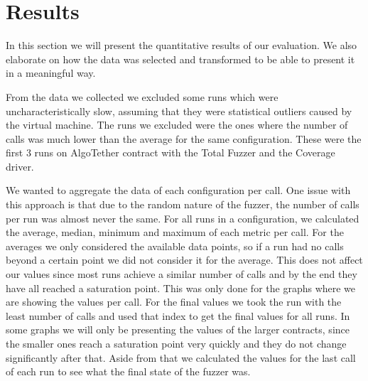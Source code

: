 \section{Results} \label{section:results}
In this section we will present the quantitative results of our evaluation.
We also elaborate on how the data was selected and transformed to be able to present it in a meaningful way.

From the data we collected we excluded some runs which were uncharacteristically slow, assuming that they were statistical outliers caused by the virtual machine.
The runs we excluded were the ones where the number of calls was much lower than the average for the same configuration.
These were the first 3 runs on AlgoTether contract with the Total Fuzzer and the Coverage driver.

We wanted to aggregate the data of each configuration per call.
One issue with this approach is that due to the random nature of the fuzzer, the number of calls per run was almost never the same.
For all runs in a configuration, we calculated the average, median, minimum and maximum of each metric per call.
For the averages we only considered the available data points, so if a run had no calls beyond a certain point we did not consider it for the average.
This does not affect our values since most runs achieve a similar number of calls and by the end they have all reached a saturation point.
This was only done for the graphs where we are showing the values per call.
For the final values we took the run with the least number of calls and used that index to get the final values for all runs.
In some graphs we will only be presenting the values of the larger contracts, since the smaller ones reach a saturation point very quickly and they do not change significantly after that.
Aside from that we calculated the values for the last call of each run to see what the final state of the fuzzer was.


